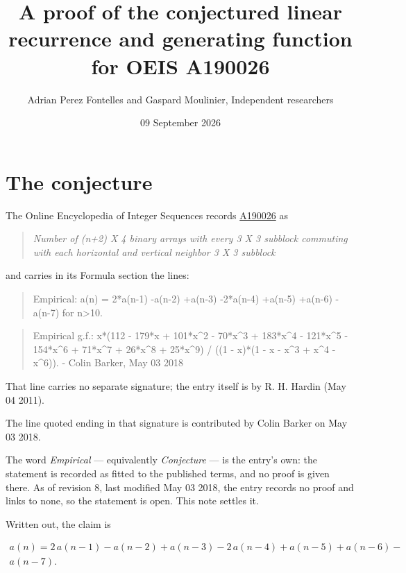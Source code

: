 \documentclass[11pt]{article}
\title{A proof of the conjectured linear recurrence and generating function for OEIS A190026}
\author{Adrian Perez Fontelles and Gaspard Moulinier, Independent researchers}
\date{09 September 2026}
\theoremstyle{definition}
\begin{document}
\maketitle
\section{The conjecture}

The Online Encyclopedia of Integer Sequences records \href{https://oeis.org/A190026}{A190026} as

\begin{quote}\itshape Number of (n+2) X 4 binary arrays with every 3 X 3 subblock commuting with each horizontal and vertical neighbor 3 X 3 subblock\end{quote}

and carries in its Formula section the lines:

\begin{quote}\ttfamily Empirical: a(n) = 2*a(n-1) -a(n-2) +a(n-3) -2*a(n-4) +a(n-5) +a(n-6) -a(n-7) for n>10.\end{quote}

\begin{quote}\ttfamily Empirical g.f.: x*(112 - 179*x + 101*x\textasciicircum{}2 - 70*x\textasciicircum{}3 + 183*x\textasciicircum{}4 - 121*x\textasciicircum{}5 - 154*x\textasciicircum{}6 + 71*x\textasciicircum{}7 + 26*x\textasciicircum{}8 + 25*x\textasciicircum{}9) / ((1 - x)*(1 - x - x\textasciicircum{}3 + x\textasciicircum{}4 - x\textasciicircum{}6)). - Colin Barker, May 03 2018\end{quote}

That line carries no separate signature; the entry itself is by R. H. Hardin (May 04 2011).

The line quoted ending in that signature is contributed by Colin Barker on May 03 2018.

The word {\itshape Empirical} --- equivalently {\itshape Conjecture} --- is the entry's own: the statement is recorded as fitted to the published terms, and no proof is given there. As of revision 8, last modified May 03 2018, the entry records no proof and links to none, so the statement is open. This note settles it.

Written out, the claim is

\begin{multline*} a(n) = 2\,a(n-1) - a(n-2) + a(n-3) - 2\,a(n-4) + a(n-5) + a(n-6) - \\ a(n-7). \end{multline*}
\end{document}
